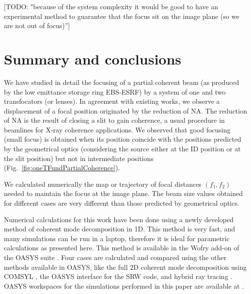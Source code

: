 \documentclass{iucr}              %
\newcommand{\todo}[1]{{\color{red}[TODO: "#1'']}}
\begin{document}
\todo{because of the system complexity it would be good to have an experimental method to guarantee that the focus sit on the image plane (so we are not out of focus)}



\section{Summary and conclusions}
\label{sec:summary}

We have studied in detail the focusing of a partial coherent beam (as produced by the low emittance storage ring EBS-ESRF) by a system of one and two transfocators (or lenses). In agreement with existing works, we observe a displacement of a focal position originated by the reduction of NA. The reduction of NA is the result of closing a slit to gain coherence, a usual procedure in beamlines for X-ray coherence applications. We observed that good focusing (small focus) is obtained when its position coincide with the positions predicted by the geometrical optics (considering the source either at the ID position or at the slit position) but not in intermediate positions (Fig.~\ref{fig:oneTFundPartialCoherence}).

We calculated numerically the map or trajectory of focal distances $(f_1,f_2)$ needed to maintain the focus at the image plane. The beam size values obtained for different cases are very different than those predicted by geometrical optics.  

Numerical calculations for this work have been done using a newly developed method of coherent mode decomposition in 1D. This method is very fast, and many simulations can be run in a laptop, therefore it is ideal for parametric calculations as presented here. This method is available in the Wofry add-on of the OASYS suite \cite{codeOASYS}. Four cases are calculated and compared using the other methods available in OASYS, like the full 2D coherent mode decomposition using COMSYL \cite{codeCOMSYL}, the OASYS interface for the SRW \cite{codeSRW} code, and hybrid ray tracing \cite{codeHYBRID}. OASYS workspaces for the simulations performed in this paper are available at \cite{repository}.
\end{document}
